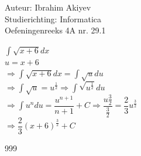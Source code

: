 \documentclass[a4paper]{article}
\begin{document}
\noindent \large Auteur: Ibrahim Akiyev \\
\noindent \large Studierichting: Informatica\\
\noindent \large Oefeningenreeks 4A nr. 29.1\\

\medskip

\normalsize

$\displaystyle \int \sqrt{x+6} dx$\\

$u = x + 6 $\\

$\Rightarrow\displaystyle \int \sqrt{x+6} dx = \int \sqrt{u} du$\\

$\Rightarrow\displaystyle \int \sqrt{u} = u^{\tfrac{1}{2}} \Rightarrow \int \sqrt{u^{\tfrac{1}{2}}}du$\\

$\Rightarrow\displaystyle \int u^n du = \dfrac{u^{n+1}}{n+1} + C \Rightarrow \dfrac{u{\tfrac{3}{2}}}{\tfrac{3}{2}} = \dfrac{2}{3} u^{\tfrac{3}{2}}$\\

$\Rightarrow \dfrac{2}{3}(x + 6)^{\tfrac{3}{2}} + C $\\

\begin{thebibliography}{999}
\end{thebibliography}
\end{document}
